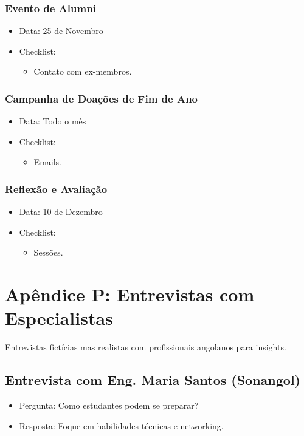 \documentclass[12pt]{article}
\begin{document}
\subsubsection{Evento de Alumni}
\begin{itemize}
    \item Data: 25 de Novembro
    \item Checklist:
      \begin{itemize}
        \item Contato com ex-membros.
      \end{itemize}
\end{itemize}

\subsubsection{Campanha de Doações de Fim de Ano}
\begin{itemize}
    \item Data: Todo o mês
    \item Checklist:
      \begin{itemize}
        \item Emails.
      \end{itemize}
\end{itemize}

\subsubsection{Reflexão e Avaliação}
\begin{itemize}
    \item Data: 10 de Dezembro
    \item Checklist:
      \begin{itemize}
        \item Sessões.
      \end{itemize}
\end{itemize}

\clearpage
\section{Apêndice P: Entrevistas com Especialistas}

Entrevistas fictícias mas realistas com profissionais angolanos para insights.

\subsection{Entrevista com Eng. Maria Santos (Sonangol)}
\begin{itemize}
    \item Pergunta: Como estudantes podem se preparar?
    \item Resposta: Foque em habilidades técnicas e networking.
\end{itemize}
\end{document}
